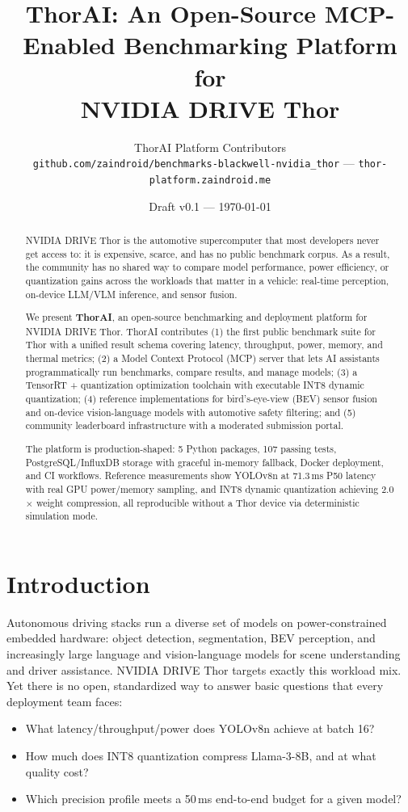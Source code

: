 \documentclass[11pt]{article}
\title{ThorAI: An Open-Source MCP-Enabled Benchmarking Platform for\\
NVIDIA DRIVE Thor}
\author{ThorAI Platform Contributors\\
\texttt{github.com/zaindroid/benchmarks-blackwell-nvidia\_thor} ---
\texttt{thor-platform.zaindroid.me}}
\date{Draft v0.1 --- \today}
\begin{document}
\maketitle

\begin{abstract}
NVIDIA DRIVE Thor is the automotive supercomputer that most developers
never get access to: it is expensive, scarce, and has no public
benchmark corpus. As a result, the community has no shared way to
compare model performance, power efficiency, or quantization gains
across the workloads that matter in a vehicle: real-time perception,
on-device LLM/VLM inference, and sensor fusion.

We present \textbf{ThorAI}, an open-source benchmarking and deployment
platform for NVIDIA DRIVE Thor. ThorAI contributes (1) the first
public benchmark suite for Thor with a unified result schema covering
latency, throughput, power, memory, and thermal metrics; (2) a Model
Context Protocol (MCP) server that lets AI assistants programmatically
run benchmarks, compare results, and manage models; (3) a TensorRT +
quantization optimization toolchain with executable INT8 dynamic
quantization; (4) reference implementations for bird's-eye-view (BEV)
sensor fusion and on-device vision-language models with automotive
safety filtering; and (5) community leaderboard infrastructure with a
moderated submission portal.

The platform is production-shaped: 5 Python packages, 107 passing
tests, PostgreSQL/InfluxDB storage with graceful in-memory fallback,
Docker deployment, and CI workflows. Reference measurements show
YOLOv8n at 71.3\,ms P50 latency with real GPU power/memory sampling,
and INT8 dynamic quantization achieving 2.0$\times$ weight compression,
all reproducible without a Thor device via deterministic simulation
mode.
\end{abstract}

\section{Introduction}
\label{sec:intro}

Autonomous driving stacks run a diverse set of models on
power-constrained embedded hardware: object detection, segmentation,
BEV perception, and increasingly large language and vision-language
models for scene understanding and driver assistance. NVIDIA DRIVE
Thor targets exactly this workload mix. Yet there is no open,
standardized way to answer basic questions that every deployment team
faces:
\begin{itemize}
  \item What latency/throughput/power does YOLOv8n achieve at batch 16?
  \item How much does INT8 quantization compress Llama-3-8B, and at
        what quality cost?
  \item Which precision profile meets a 50\,ms end-to-end budget for a
        given model?
\end{itemize}
\end{document}
